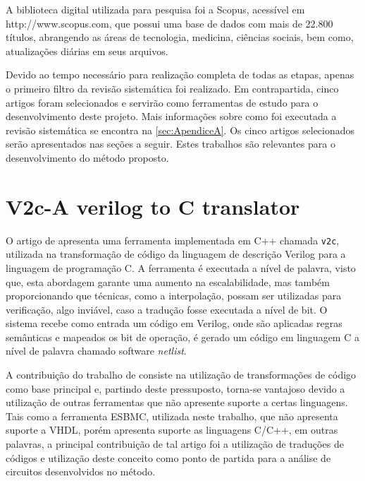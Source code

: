 \par
A biblioteca digital utilizada para pesquisa foi a Scopus, acessível em http://www.scopus.com, que possui uma base de dados com mais de 22.800 títulos, abrangendo as áreas de tecnologia, medicina, ciências sociais, bem como, atualizações diárias em seus arquivos.

\par
Devido ao tempo necessário para realização completa de todas as etapas, apenas o primeiro filtro da revisão sistemática foi realizado. Em contrapartida, cinco artigos foram selecionados e servirão como ferramentas de estudo para o desenvolvimento deste projeto. Mais informações sobre como foi executada a revisão sistemática se encontra na \autoref{sec:ApendiceA}. Os cinco artigos selecionados serão apresentados nas seções a seguir. Estes trabalhos são relevantes para o desenvolvimento do método proposto. 

\section{V2c-A verilog to C translator}

O artigo de \citeauthor{mukherjee2016v2c} apresenta uma ferramenta implementada em C++ chamada \texttt{v2c}, utilizada na transformação de código da linguagem de descrição Verilog para a linguagem de programação C. A ferramenta é executada a nível de palavra, visto que, esta abordagem garante uma aumento na escalabilidade, mas também proporcionando que técnicas, como a interpolação\cite{beyer2011cpachecker}, possam ser utilizadas para verificação, algo inviável, caso a tradução fosse executada a nível de bit. O sistema recebe como entrada um código em Verilog, onde são aplicadas regras semânticas e mapeados os bit de operação, é gerado um código em linguagem C a nível de palavra chamado software \textit{netlist}.

\par
A contribuição do trabalho de \cite{mukherjee2016v2c} consiste na utilização de transformações de código como base principal e, partindo deste pressuposto, torna-se vantajoso devido a utilização de outras ferramentas que não apresente suporte a certas linguagens. Tais como a ferramenta ESBMC, utilizada neste trabalho, que não apresenta suporte a VHDL, porém apresenta suporte as linguagens C/C++, em outras palavras, a principal contribuição de tal artigo foi a utilização de traduções de códigos e utilização deste conceito como ponto de partida para a análise de circuitos desenvolvidos no método.

